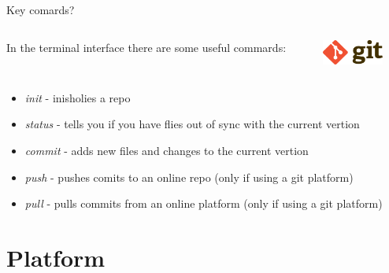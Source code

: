 \documentclass[10pt]{beamer}
\begin{document}
\begin{frame}[fragile]{Key comards?}
  \begin{columns}[T]
    \begin{column}{.8\textwidth}
	In the terminal interface there are some useful commards:
    \end{column}
    \begin{column}{.2\textwidth}
	\includegraphics[width=2cm]{Figs/Git-logo}
    \end{column}
  \end{columns}
	\begin{itemize}
		\item \textit{init} - inisholies a repo
		\item \textit{status} - tells you if you have flies out of sync with the current vertion
		\item \textit{commit} - adds new files and changes to the current vertion
		\item \textit{push} - pushes comits to an online repo (only if using a git platform)
		\item \textit{pull} - pulls commits from an online platform (only if using a git platform)
	\end{itemize}
\end{frame}



\section{Platform}
\end{document}
